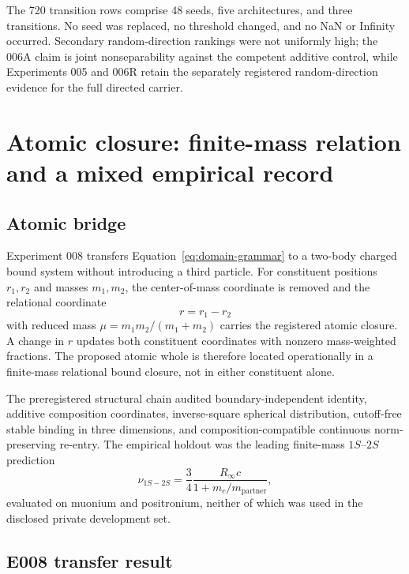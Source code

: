 \documentclass[11pt,a4paper]{article}
\begin{document}
The 720 transition rows comprise 48 seeds, five architectures, and three transitions. No seed was replaced, no threshold changed, and no NaN or Infinity occurred. Secondary random-direction rankings were not uniformly high; the 006A claim is joint nonseparability against the competent additive control, while Experiments 005 and 006R retain the separately registered random-direction evidence for the full directed carrier.

\section{Atomic closure: finite-mass relation and a mixed empirical record}

\subsection{Atomic bridge}

Experiment 008 transfers Equation~\eqref{eq:domain-grammar} to a two-body charged bound system without introducing a third particle. For constituent positions $r_1,r_2$ and masses $m_1,m_2$, the center-of-mass coordinate is removed and the relational coordinate
\begin{equation}
 r=r_1-r_2
\end{equation}
with reduced mass $\mu=m_1m_2/(m_1+m_2)$ carries the registered atomic closure. A change in $r$ updates both constituent coordinates with nonzero mass-weighted fractions. The proposed atomic whole is therefore located operationally in a finite-mass relational bound closure, not in either constituent alone.

The preregistered structural chain audited boundary-independent identity, additive composition coordinates, inverse-square spherical distribution, cutoff-free stable binding in three dimensions, and composition-compatible continuous norm-preserving re-entry. The empirical holdout was the leading finite-mass $1S$--$2S$ prediction
\begin{equation}
 \nu_{1S-2S}=\frac{3}{4}\frac{R_\infty c}{1+m_e/m_{\mathrm{partner}}},
 \label{eq:atomic-leading}
\end{equation}
evaluated on muonium and positronium, neither of which was used in the disclosed private development set.

\subsection{E008 transfer result}
\end{document}
